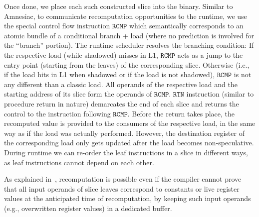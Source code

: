Once done, we place 
each such constructed slice into the binary. 
Similar to Amnesiac, to communicate recomputation opportunities to the runtime, we use 
the special control
flow instruction $\texttt{RCMP}$ which semantically corresponds to an atomic bundle of a conditional branch + load (where no prediction is involved for the ``branch'' portion).
The runtime scheduler resolves the branching condition: If the respective load (while shadowed) misses in L1, $\texttt{RCMP}$ acts as a jump to the entry point (starting from the
leaves) of the corresponding slice. Otherwise (i.e., if the load hits in L1 when shadowed or if the load is not shadowed), $\texttt{RCMP}$ is not any different than a classic load.
All operands of
the respective load and the starting address of its slice form the operands of $\texttt{RCMP}$. 
$\texttt{RTN}$ instruction (similar to procedure return in nature) demarcates the end of each slice and returns the control to the instruction following $\texttt{RCMP}$. Before the return takes place, the recomputed value is provided to the consumers of the respective load, in the same way as if the load was actually performed. However, the destination register of the corresponding load only gets updated after the load becomes non-speculative.
During runtime we can re-order the leaf instructions in a slice in different ways, as leaf instructions cannot
depend on each other. 

As explained in~\cite{amnesiac17}, recomputation is possible even if the compiler cannot prove that all input operands of
slice leaves correspond to constants or live register values at the anticipated
time of recomputation, by keeping such input operands (e.g., overwritten register values) in a dedicated buffer.

